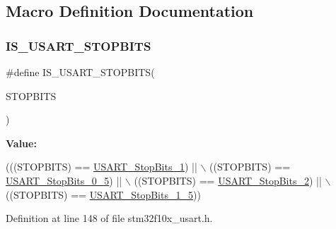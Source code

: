 \subsection{Macro Definition Documentation}
\mbox{\label{group___u_s_a_r_t___stop___bits_ga6f9153c1fbee1058ba26ec88f0f20828}} 
\subsubsection{\texorpdfstring{I\+S\+\_\+\+U\+S\+A\+R\+T\+\_\+\+S\+T\+O\+P\+B\+I\+TS}{IS\_USART\_STOPBITS}}
{\footnotesize\ttfamily \#define I\+S\+\_\+\+U\+S\+A\+R\+T\+\_\+\+S\+T\+O\+P\+B\+I\+TS(\begin{DoxyParamCaption}\item[{}]{S\+T\+O\+P\+B\+I\+TS }\end{DoxyParamCaption})}

{\bfseries Value\+:}
\begin{DoxyCode}
(((STOPBITS) == \hyperlink{group___u_s_a_r_t___stop___bits_gae2cb35620ba001f0d63e9e0be93e4a05}{USART\_StopBits\_1}) || \(\backslash\)
                                     ((STOPBITS) == \hyperlink{group___u_s_a_r_t___stop___bits_ga2ad06e3acfb691735d05ab9a314e2e32}{USART\_StopBits\_0\_5}) || \(\backslash\)
                                     ((STOPBITS) == \hyperlink{group___u_s_a_r_t___stop___bits_ga652058b6be2f48ac0d82d0e75537fc81}{USART\_StopBits\_2}) || \(\backslash\)
                                     ((STOPBITS) == \hyperlink{group___u_s_a_r_t___stop___bits_ga30897cc46d5b3790a9b14ffaba354527}{USART\_StopBits\_1\_5}))
\end{DoxyCode}


Definition at line 148 of file stm32f10x\+\_\+usart.\+h.

\mbox{\label{group___u_s_a_r_t___stop___bits_ga2ad06e3acfb691735d05ab9a314e2e32}} 

